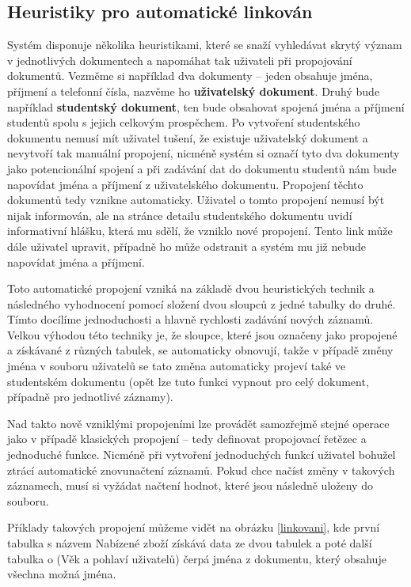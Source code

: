 \subsection{Heuristiky pro automatické linkován}
\par Systém disponuje několika heuristikami, které se snaží vyhledávat skrytý význam v jednotlivých dokumentech a napomáhat tak uživateli při propojování dokumentů. Vezměme si například dva dokumenty -- jeden obsahuje jména, příjmení a telefonní čísla, nazvěme ho \textbf{uživatelský dokument}. Druhý bude například \textbf{studentský dokument}, ten bude obsahovat spojená jména a příjmení studentů spolu s jejich celkovým prospěchem. Po vytvoření studentského dokumentu nemusí mít uživatel tušení, že existuje uživatelský dokument a nevytvoří tak manuální propojení, nicméně systém si označí tyto dva dokumenty jako potencionální spojení a při zadávání dat do dokumentu studentů nám bude napovídat jména a příjmení z uživatelského dokumentu. Propojení těchto dokumentů tedy vznikne automaticky. Uživatel o tomto propojení nemusí být nijak informován, ale na stránce detailu studentského dokumentu uvidí informativní hlášku, která mu sdělí, že vzniklo nové propojení. Tento link může dále uživatel upravit, případně ho může odstranit a systém mu již nebude napovídat jména a příjmení.

\par Toto automatické propojení vzniká na základě dvou heuristických technik a následného vyhodnocení pomocí složení dvou sloupců z jedné tabulky do druhé. Tímto docílíme jednoduchosti a hlavně rychlosti zadávání nových záznamů. Velkou výhodou této techniky je, že sloupce, které jsou označeny jako propojené a získávané z různých tabulek, se automaticky obnovují, takže v případě změny jména v souboru uživatelů se tato změna automaticky projeví také ve studentském dokumentu (opět lze tuto funkci vypnout pro celý dokument, případně pro jednotlivé záznamy).

\par Nad takto nově vzniklými propojeními lze provádět samozřejmě stejné operace jako v případě klasických propojení -- tedy definovat propojovací řetězec a jednoduché funkce. Nicméně při vytvoření jednoduchých funkcí uživatel bohužel ztrácí automatické znovunačtení záznamů. Pokud chce načíst změny v takových záznamech, musí si vyžádat načtení hodnot, které jsou následně uloženy do souboru.

\par Příklady takových propojení můžeme vidět na obrázku \ref{linkovani}, kde první tabulka s názvem Nabízené zboží získává data ze dvou tabulek a poté další tabulka o (Věk a pohlaví uživatelů) čerpá jména z dokumentu, který obsahuje všechna možná jména.

